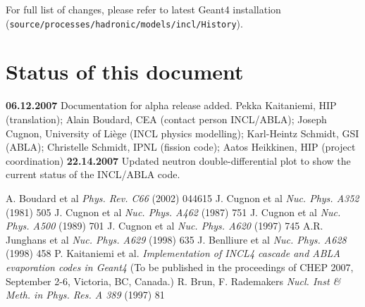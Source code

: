 
%

For full list of changes, please refer to latest Geant4 installation
({\tt source\-/processes\-/hadronic\-/models\-/incl\-/History}).

\section{Status of this document}

{\bf 06.12.2007} Documentation for alpha release added. Pekka
Kaitaniemi, HIP (translation); Alain Boudard, CEA (contact person
INCL/ABLA); Joseph Cugnon, University of Li\`ege (INCL physics
modelling); Karl-Heintz Schmidt, GSI (ABLA); Christelle Schmidt, IPNL
(fission code); Aatos Heikkinen, HIP (project coordination)
{\bf 22.14.2007} Updated neutron double-differential plot to show
the current status of the INCL/ABLA code.


\begin{thebibliography}{99}



 A. Boudard et al \emph{Phys. Rev. C66} (2002) 044615
 J. Cugnon et al \emph{Nuc. Phys. A352} (1981) 505
 J. Cugnon et al \emph{Nuc. Phys. A462} (1987) 751
 J. Cugnon et al \emph{Nuc. Phys. A500} (1989) 701
 J. Cugnon et al \emph{Nuc. Phys. A620} (1997) 745
 A.R. Junghans et al \emph{Nuc. Phys. A629} (1998) 635
 J. Benlliure et al \emph{Nuc. Phys. A628} (1998) 458
 P. Kaitaniemi et al. \emph{Implementation of
    INCL4 cascade and ABLA evaporation codes in Geant4} (To be
    published in the proceedings of CHEP 2007, September 2-6,
    Victoria, BC, Canada.)
 R. Brun, F. Rademakers \emph{Nucl. Inst \&
    Meth. in Phys. Res. A 389} (1997) 81
\end{thebibliography}
